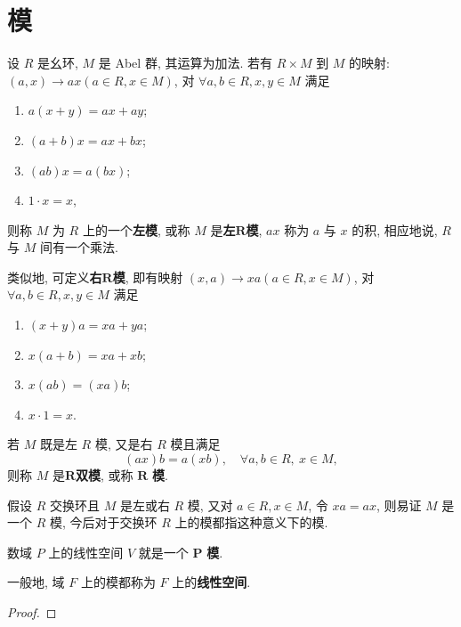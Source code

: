 \documentclass[../../main.tex]{subfiles}%
\begin{document}
\section{模}

\begin{definition}[模]
设 \( R \) 是幺环, \( M \) 是 Abel 群, 其运算为加法. 若有 \( R \times M \) 到 \( M \) 的映射: \( (a,x) \to ax (a \in R, x \in M) \), 对 \( \forall a,b \in R, x,y \in M \) 满足
\begin{enumerate}[(1)]
\item \( a(x + y) = ax + ay \);
\item \( (a + b)x = ax + bx \);
\item \( (ab)x = a(bx) \);
\item \( 1 \cdot x = x \),
\end{enumerate}
则称 \( M \) 为 \( R \) 上的一个\textbf{左模}, 或称 \( M \) 是\textbf{左}\(\boldsymbol{R}\)\textbf{模}, \( ax \) 称为 \( a \) 与 \( x \) 的积, 相应地说, \( R \) 与 \( M \) 间有一个乘法.

类似地, 可定义\textbf{右}\(\boldsymbol{R}\)\textbf{模}, 即有映射 \( (x,a) \to xa (a \in R, x \in M) \), 对 \( \forall a,b \in R, x,y \in M \) 满足
\begin{enumerate}[(1)]
\item \( (x + y)a = xa + ya \);
\item \( x(a + b) = xa + xb \);
\item \( x(ab) = (xa)b \);
\item \( x \cdot 1 = x \).
\end{enumerate}

若 \( M \) 既是左 \( R \) 模, 又是右 \( R \) 模且满足
\[
(ax)b = a(xb), \quad \forall a,b \in R, \ x \in M,
\]
则称 \( M \) 是\(\boldsymbol{R}\)\textbf{双模}, 或称 \( \boldsymbol{R} \) \textbf{模}.
\end{definition}
\begin{remark}
假设 \( R \) 交换环且 \( M \) 是左或右 \( R \) 模, 又对 \( a \in R, x \in M \), 令 \( xa = ax \), 则易证 \( M \) 是一个 \( R \) 模, 今后对于交换环 \( R \) 上的模都指这种意义下的模.
\end{remark}

\begin{theorem}\label{theorem:域上的线性空间}
数域 \( P \) 上的线性空间 \( V \) 就是一个 \( \boldsymbol{P} \) \textbf{模}. 

一般地, 域 \( F \) 上的模都称为 \( F \) 上的\textbf{线性空间}.
\end{theorem}
\begin{proof}



\end{proof}
\end{document}
